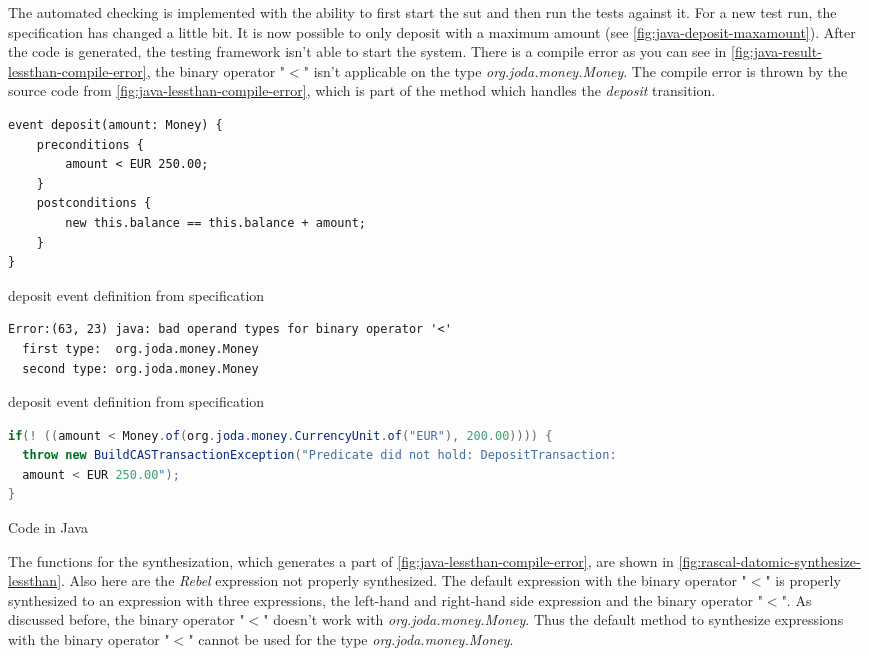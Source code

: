 The automated checking is implemented with the ability to first start the
\gls{sut} and then run the tests against it. For a new test run, the
specification has changed a little bit. It is now possible to only deposit with
a maximum amount (see \autoref{fig:java-deposit-maxamount}). After the code is
generated, the testing framework isn't able to start the system. There is a
compile error as you can see in
\autoref{fig:java-result-lessthan-compile-error}, the binary operator "$<$"
isn't applicable on the type \textit{org.joda.money.Money}. The compile error
is thrown by the source code from \autoref{fig:java-lessthan-compile-error},
which is part of the method which handles the \textit{deposit} transition.


\begin{sourcecode}[h!]
\begin{lstlisting}[]
event deposit(amount: Money) {
	preconditions {
		amount < EUR 250.00;
	}
	postconditions {
		new this.balance == this.balance + amount;
	}
}
\end{lstlisting}
\caption{deposit event definition from specification}\label{fig:java-deposit-maxamount}
\end{sourcecode}
\FloatBarrier

\begin{sourcecode}[h!]
\begin{lstlisting}[]
Error:(63, 23) java: bad operand types for binary operator '<'
  first type:  org.joda.money.Money
  second type: org.joda.money.Money
\end{lstlisting}
\caption{deposit event definition from specification}\label{fig:java-result-lessthan-compile-error}
\end{sourcecode}
\FloatBarrier

\begin{sourcecode}[h!]
\begin{lstlisting}[language=Java]
if(! ((amount < Money.of(org.joda.money.CurrencyUnit.of("EUR"), 200.00)))) {
  throw new BuildCASTransactionException("Predicate did not hold: DepositTransaction:
  amount < EUR 250.00");
}
\end{lstlisting}
\caption{Code in Java}\label{fig:java-lessthan-compile-error}
\end{sourcecode}
\FloatBarrier

The functions for the synthesization, which generates a part of
\autoref{fig:java-lessthan-compile-error}, are shown in
\autoref{fig:rascal-datomic-synthesize-lessthan}. Also here are the \textit{Rebel}
expression not properly synthesized. The default expression with the binary
operator "$<$" is properly synthesized to an expression with three expressions,
the left-hand and right-hand side expression and the binary operator "$<$".
As discussed before, the binary operator "$<$" doesn't work with
\textit{org.joda.money.Money}. Thus the default method to synthesize expressions
with the binary operator "$<$" cannot be used for the type
\textit{org.joda.money.Money}.

